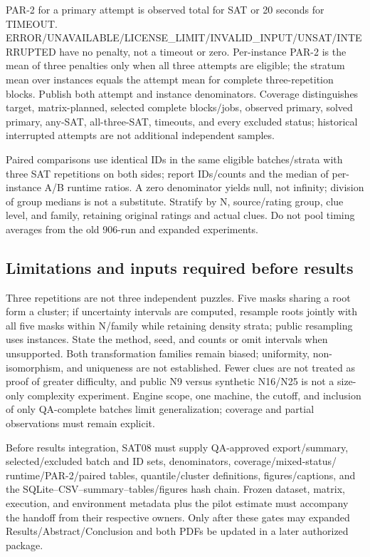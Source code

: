 PAR-2 for a primary attempt is observed total for SAT or 20 seconds for
TIMEOUT. ERROR/UNAVAILABLE/LICENSE\_LIMIT/INVALID\_INPUT/UNSAT/INTERRUPTED
have no penalty, not a timeout or zero. Per-instance PAR-2 is the mean of
three penalties only when all three attempts are eligible; the stratum mean
over instances equals the attempt mean for complete three-repetition blocks.
Publish both attempt and instance denominators. Coverage distinguishes target,
matrix-planned, selected complete blocks/jobs, observed primary, solved
primary, any-SAT, all-three-SAT, timeouts, and every excluded status; historical
interrupted attempts are not additional independent samples.

Paired comparisons use identical IDs in the same eligible batches/strata
with three SAT repetitions on both sides; report IDs/counts and the median
of per-instance A/B runtime ratios. A zero denominator yields null, not
infinity; division of group medians is not a substitute. Stratify by N,
source/rating group, clue level, and family, retaining original ratings and
actual clues. Do not pool timing averages from the old 906-run and expanded
experiments.

\subsection{Limitations and inputs required before results}
Three repetitions are not three independent puzzles. Five masks sharing a
root form a cluster; if uncertainty intervals are computed, resample roots
jointly with all five masks within N/family while retaining density strata;
public resampling uses instances. State the method, seed, and counts or omit
intervals when unsupported. Both transformation families remain biased;
uniformity, non-isomorphism, and uniqueness are not established. Fewer clues
are not treated as proof of greater difficulty, and public N9 versus synthetic
N16/N25 is not a size-only complexity experiment. Engine scope, one machine,
the cutoff, and inclusion of only QA-complete batches limit generalization;
coverage and partial observations must remain explicit.

Before results integration, SAT08 must supply QA-approved export/summary,
selected/excluded batch and ID sets, denominators, coverage/mixed-status/
runtime/PAR-2/paired tables, quantile/cluster definitions, figures/captions,
and the SQLite--CSV--summary--tables/figures hash chain. Frozen dataset,
matrix, execution, and environment metadata plus the pilot estimate must
accompany the handoff from their respective owners. Only after these gates
may expanded Results/Abstract/Conclusion and both PDFs be updated in a later
authorized package.
